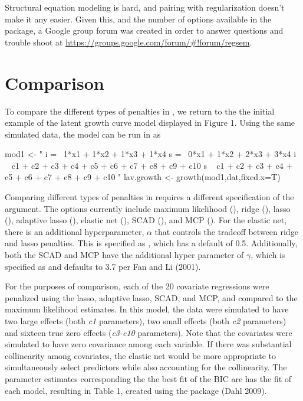 \documentclass[article]{jss}
\begin{document}
Structural equation modeling is hard, and pairing with regularization
doesn't make it any easier. Given this, and the number of options
available in the  package, a Google group forum was created
in order to answer questions and trouble shoot at
\url{https://groups.google.com/forum/\#!forum/regsem}.

\section{Comparison}\label{comparison}

To compare the different types of penalties in , we return
to the the initial example of the latent growth curve model displayed in
Figure 1. Using the same simulated data, the model can be run in
 as

\begin{CodeChunk}
\begin{CodeInput}
mod1 <- "
i =~ 1*x1 + 1*x2 + 1*x3 + 1*x4
s =~ 0*x1 + 1*x2 + 2*x3 + 3*x4
i ~ c1 + c2 + c3 + c4 + c5 + c6 + c7 + c8 + c9 + c10
s ~ c1 + c2 + c3 + c4 + c5 + c6 + c7 + c8 + c9 + c10
"
lav.growth <- growth(mod1,dat,fixed.x=T)
\end{CodeInput}
\end{CodeChunk}

Comparing different types of penalties in  requires a
different specification of the  argument. The options
currently include maximum likelihood (), ridge
(), lasso (), adaptive lasso
(), elastic net (), SCAD (),
and MCP (). For the elastic net, there is an additional
hyperparameter, \(\alpha\) that controls the tradeoff between ridge and
lasso penalties. This is specified as  , which has a
default of 0.5. Additionally, both the SCAD and MCP have the additional
hyper parameter of \(\gamma\), which is specified as  and
defaults to 3.7 per Fan and Li (2001).

For the purposes of comparison, each of the 20 covariate regressions
were penalized using the lasso, adaptive lasso, SCAD, and MCP, and
compared to the maximum likelihood estimates. In this model, the data
were simulated to have two large effects (both \textit{c1} parameters),
two small effects (both \textit{c2} parameters) and sixteen true zero
effects (\textit{c3-c10} parameters). Note that the covariates were
simulated to have zero covariance among each variable. If there was
substantial collinearity among covariates, the elastic net would be more
appropriate to simultaneously select predictors while also accounting
for the collinearity. The parameter estimates corresponding the the best
fit of the BIC are has the fit of each model, resulting in Table 1,
created using the  package (Dahl 2009).
\end{document}
